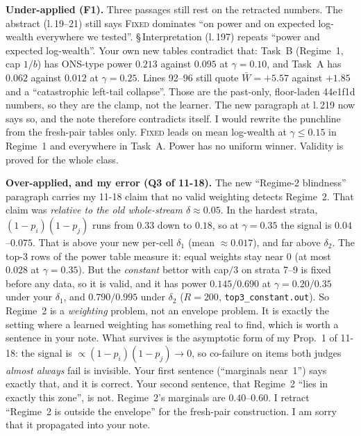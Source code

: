 \documentclass[11pt]{article}
\begin{document}
\textbf{Under-applied (F1).} Three passages still rest on the retracted numbers.
The abstract (l.\,19--21) still says \textsc{Fixed} dominates ``on power and on expected log-wealth everywhere we tested''. \S\,Interpretation (l.\,197) repeats ``power and expected log-wealth''.
Your own new tables contradict that: Task~B (Regime~1, cap $1/b$) has ONS-type power $0.213$ against $0.095$ at $\gamma=0.10$, and Task~A has $0.062$ against $0.012$ at $\gamma=0.25$.
Lines 92--96 still quote $\bar W=+5.57$ against $+1.85$ and a ``catastrophic left-tail collapse''. Those are the past-only, floor-laden 44e1f1d numbers, so they are the clamp, not the learner. The new paragraph at l.\,219 now says so, and the note therefore contradicts itself.
I would rewrite the punchline from the fresh-pair tables only. \textsc{Fixed} leads on mean log-wealth at $\gamma\le0.15$ in Regime~1 and everywhere in Task~A. Power has no uniform winner. Validity is proved for the whole class.

\textbf{Over-applied, and my error (Q3 of 11-18).} The new ``Regime-2 blindness'' paragraph carries my 11-18 claim that no valid weighting detects Regime~2. That claim was \emph{relative to the old whole-stream $\delta\approx0.05$}. In the hardest strata, $(1-p_i)(1-p_j)$ runs from $0.33$ down to $0.18$, so at $\gamma=0.35$ the signal is $0.04$--$0.075$. That is above your new per-cell $\delta_1$ (mean $\approx0.017$), and far above $\delta_2$.
The top-3 rows of the power table measure it: equal weights stay near $0$ (at most $0.028$ at $\gamma=0.35$). But the \emph{constant} bettor with cap$/3$ on strata 7--9 is fixed before any data, so it is valid, and it has power $0.145/0.690$ at $\gamma=0.20/0.35$ under your $\delta_1$, and $0.790/0.995$ under $\delta_2$ ($R=200$, \texttt{top3\_constant.out}). So Regime~2 is a \emph{weighting} problem, not an envelope problem. It is exactly the setting where a learned weighting has something real to find, which is worth a sentence in your note.
What survives is the asymptotic form of my Prop.~1 of 11-18: the signal is $\propto(1-p_i)(1-p_j)\to0$, so co-failure on items both judges \emph{almost always} fail is invisible. Your first sentence (``marginals near~1'') says exactly that, and it is correct.
Your second sentence, that Regime~2 ``lies in exactly this zone'', is not. Regime~2's marginals are $0.40$--$0.60$.
I retract ``Regime~2 is outside the envelope'' for the fresh-pair construction. I am sorry that it propagated into your note.
\end{document}
